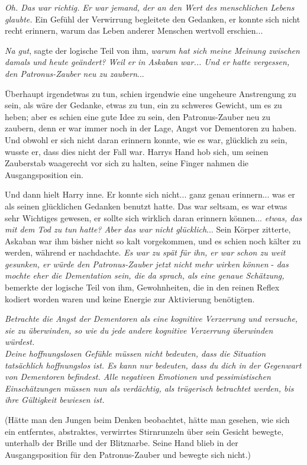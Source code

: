 {\emph{Oh. Das war richtig. Er war jemand, der an den Wert des menschlichen Lebens glaubte.} Ein Gefühl der Verwirrung begleitete den Gedanken, er konnte sich nicht recht erinnern, warum das Leben anderer Menschen wertvoll erschien...

\emph{Na gut}, sagte der logische Teil von ihm, \emph{warum hat sich meine Meinung zwischen damals und heute geändert? Weil er in Askaban war... Und er hatte vergessen, den Patronus-Zauber neu zu zaubern}...

Überhaupt irgendetwas zu tun, schien irgendwie eine ungeheure Anstrengung zu sein, als wäre der Gedanke, etwas zu tun, ein zu schweres Gewicht, um es zu heben; aber es schien eine gute Idee zu sein, den Patronus-Zauber neu zu zaubern, denn er war immer noch in der Lage, Angst vor Dementoren zu haben. Und obwohl er sich nicht daran erinnern konnte, wie es war, glücklich zu sein, wusste er, dass dies nicht der Fall war. Harrys Hand hob sich, um seinen Zauberstab waagerecht vor sich zu halten, seine Finger nahmen die Ausgangsposition ein.

Und dann hielt Harry inne. Er konnte sich nicht... ganz genau erinnern... was er als seinen glücklichen Gedanken benutzt hatte. Das war seltsam, es war etwas sehr Wichtiges gewesen, er sollte sich wirklich daran erinnern können... \emph{etwas, das mit dem Tod zu tun hatte? Aber das war nicht glücklich}... Sein Körper zitterte, Askaban war ihm bisher nicht so kalt vorgekommen, und es schien noch kälter zu werden, während er nachdachte. \emph{Es war zu spät für ihn, er war schon zu weit gesunken, er würde den Patronus-Zauber jetzt nicht mehr wirken können} - \emph{das mochte eher die Dementation sein, die da sprach, als eine genaue Schätzung,} bemerkte der logische Teil von ihm, Gewohnheiten, die in den reinen Reflex kodiert worden waren und keine Energie zur Aktivierung benötigten.

\emph{Betrachte die Angst der Dementoren als eine kognitive Verzerrung und versuche, sie zu überwinden, so wie du jede andere kognitive Verzerrung überwinden würdest.\\ Deine hoffnungslosen Gefühle müssen nicht bedeuten, dass die Situation tatsächlich hoffnungslos ist. Es kann nur bedeuten, dass du dich in der Gegenwart von Dementoren befindest. Alle negativen Emotionen und pessimistischen Einschätzungen müssen nun als verdächtig, als trügerisch betrachtet werden, bis ihre Gültigkeit bewiesen ist.}

(Hätte man den Jungen beim Denken beobachtet, hätte man gesehen, wie sich ein entferntes, abstraktes, verwirrtes Stirnrunzeln über sein Gesicht bewegte, unterhalb der Brille und der Blitznarbe. Seine Hand blieb in der Ausgangsposition für den Patronus-Zauber und bewegte sich nicht.)

}
